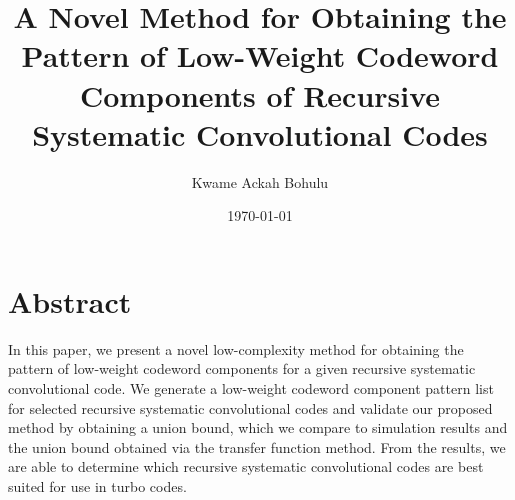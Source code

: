 \documentclass[11pt, oneside, dvipdfmx]{book}
\begin{document}
\title{
A Novel Method for Obtaining the Pattern of Low-Weight Codeword Components of Recursive Systematic Convolutional Codes}
\author{Kwame Ackah Bohulu}
\date{\today}
\maketitle
\newpage
\section{Abstract}
In this paper, we present a novel low-complexity method for obtaining the pattern of low-weight codeword components for a given recursive systematic convolutional code. %
We generate a low-weight codeword component pattern list for selected recursive systematic convolutional codes and validate our proposed method by obtaining a union bound, which we compare to simulation results and the union bound obtained via the transfer function method. From the results, we are able to determine which recursive systematic convolutional codes are best suited for use in turbo codes.
\newpage

\newpage

\newpage

\newpage
%

\newpage

\newpage
%
\newpage


\end{document}
